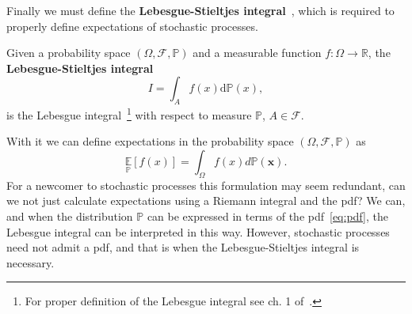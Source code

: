 Finally we must define the \textbf{Lebesgue-Stieltjes integral}~\cite{halmos2013measure}, which is required to properly define expectations of stochastic processes. 
\begin{definition}
		Given a probability space $(\Omega, \mathcal{F}, \mathbb{P})$ and a measurable function $f:\Omega \rightarrow \mathbb{R}$, the \textbf{Lebesgue-Stieltjes integral} 
		\begin{equation}
			I = \int_A f(x) \mathrm{d}\mathbb{P}(x),
		\end{equation}
		is the Lebesgue integral~\footnote{For proper definition of the Lebesgue integral see ch. 1 of~\cite{salamon2016measure}.} with respect to measure $\mathbb{P}$, $A \in \mathcal{F}$.
\end{definition}
With it we can define expectations in the probability space $(\Omega, \mathcal{F}, \mathbb{P})$ as
\begin{equation}
	\underset{{\mathbb{P}}}{\mathbb{E}}[f(x)]=\int_{\Omega} f(x) d \mathbb{P}(\boldsymbol{x}).
\end{equation}
For a newcomer to stochastic processes this formulation may seem redundant, can we not just calculate expectations using a Riemann integral and the pdf? We can, and when the distribution $\mathbb{P}$ can be expressed in terms of the pdf~\eqref{eq:pdf}, the Lebesgue integral can be interpreted in this way. However, stochastic processes need not admit a pdf, and that is when the Lebesgue-Stieltjes integral is necessary.

